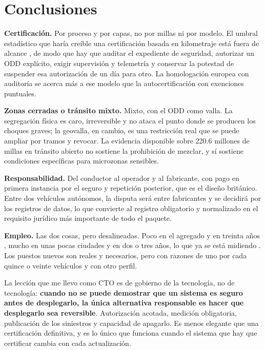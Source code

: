 \documentclass[11pt,letterpaper]{article}
\begin{document}
\section*{Conclusiones}

\textbf{Certificación.} Por proceso y por capas, no por millas ni por modelo. El
umbral estadístico que haría creíble una certificación basada en kilometraje está
fuera de alcance \parencite{kalra2016}, de modo que hay que auditar el expediente
de seguridad, autorizar un ODD explícito, exigir supervisión y telemetría y
conservar la potestad de suspender esa autorización de un día para otro. La
homologación europea con auditoría se acerca más a ese modelo que la
autocertificación con exenciones puntuales.

\textbf{Zonas cerradas o tránsito mixto.} Mixto, con el ODD como valla. La
segregación física es caro, irreversible y no ataca el punto donde se producen
los choques graves; la geovalla, en cambio, es una restricción real que se puede
ampliar por tramos y revocar. La evidencia disponible sobre \num{220.6} millones
de millas en tránsito abierto no sostiene la prohibición de mezclar, y sí sostiene
condiciones específicas para microzonas sensibles.

\textbf{Responsabilidad.} Del conductor al operador y al fabricante, con pago en
primera instancia por el seguro y repetición posterior, que es el diseño
británico. Entre dos vehículos autónomos, la disputa será entre fabricantes y se
decidirá por los registros de datos, lo que convierte al registro obligatorio y
normalizado en el requisito jurídico más importante de todo el paquete.

\textbf{Empleo.} Las dos cosas, pero desalineadas. Poco en el agregado y en
treinta años \parencite{groshen2018}, mucho en unas pocas ciudades y en dos o
tres años, lo que ya se está midiendo \parencite{gridwise2026}. Los puestos
nuevos son reales y necesarios, pero con razones de uno por cada quince o veinte
vehículos y con otro perfil.

La lección que me llevo como CTO es de gobierno de la tecnología, no de
tecnología: \textbf{cuando no se puede demostrar que un sistema es seguro antes
de desplegarlo, la única alternativa responsable es hacer que desplegarlo sea
reversible}. Autorización acotada, medición obligatoria, publicación de los
siniestros y capacidad de apagarlo. Es menos elegante que una certificación
definitiva, y es lo único que funciona cuando el sistema que hay que certificar
cambia con cada actualización.

\printbibliography[title={Referencias bibliográficas}]
\end{document}
